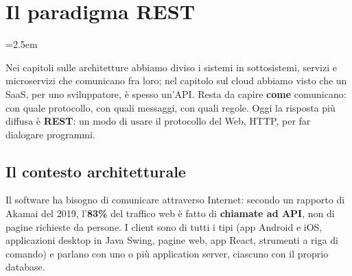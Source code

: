 \chapter{Il paradigma REST}
\emergencystretch=2.5em

Nei capitoli sulle architetture abbiamo diviso i sistemi in sottosistemi, servizi e microservizi che comunicano fra loro;
nel capitolo sul cloud abbiamo visto che un SaaS, per uno sviluppatore, è spesso un'API. Resta da capire \textbf{come}
comunicano: con quale protocollo, con quali messaggi, con quali regole. Oggi la risposta più diffusa è \textbf{REST}: un
modo di usare il protocollo del Web, HTTP, per far dialogare programmi.


\section{Il contesto architetturale}

Il software ha bisogno di comunicare attraverso Internet: secondo un rapporto di Akamai del 2019, l'\textbf{83\%} del
traffico web è fatto di \textbf{chiamate ad API}, non di pagine richieste da persone. I client sono di tutti i tipi
(app Android e iOS, applicazioni desktop in Java Swing, pagine web, app React, strumenti a riga di comando) e parlano con
uno o più application server, ciascuno con il proprio database.

